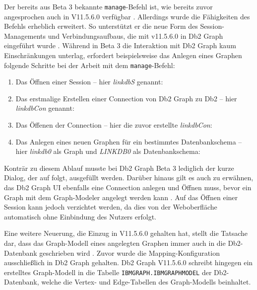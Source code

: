 Der bereits aus Beta 3 bekannte \texttt{manage}-Befehl ist, wie bereits zuvor angesprochen auch in V11.5.6.0 verfügbar \cite{ibm_docs_db2_graph_commands}. Allerdings wurde die Fähigkeiten des Befehls erheblich erweitert. So unterstützt er die neue Form des Session-Managements und Verbindungsaufbaus, die mit v11.5.6.0 in Db2 Graph eingeführt wurde \cite{ibm_docs_db2_graph_commands}. Während in Beta 3 die Interaktion mit Db2 Graph kaum Einschränkungen unterlag, erfordert beispielsweise das Anlegen eines Graphen folgende Schritte bei der Arbeit mit dem \texttt{manage}-Befehl:

\begin{enumerate}
    \item Das Öffnen einer Session -- hier \textit{linkdbS} genannt:\\
    \item Das erstmalige Erstellen einer Connection von Db2 Graph zu Db2 -- hier \textit{linkdbCon} genannt:\\
    \item Das Öffenen der Connection -- hier die zuvor erstellte \textit{linkdbCon}:\\
    \item Das Anlegen eines neuen Graphen für ein bestimmtes Datenbankschema -- hier \textit{linkdb0} als Graph und \textit{LINKDB0} als Datenbankschema:\\ 
\end{enumerate}

Konträr zu diesem Ablauf musste bei Db2 Graph Beta 3 lediglich der kurze Dialog, der auf  folgt, ausgefüllt werden. Darüber hinaus gilt es auch zu erwähnen, das Db2 Graph UI ebenfalls eine Connection anlegen und Öffnen muss, bevor ein Graph mit dem Graph-Modeler angelegt werden kann \cite{ibm_docs_db2_graph_ui}. Auf das Öffnen einer Session kann jedoch verzichtet werden, da dies von der Weboberfläche automatisch ohne Einbindung des Nutzers erfolgt.

Eine weitere Neuerung, die Einzug in V11.5.6.0 gehalten hat, stellt die Tatsache dar, dass das Graph-Modell eines angelegten Graphen immer auch in die Db2-Datenbank geschrieben wird \cite{ibm_docs_privileges}. Zuvor wurde die Mapping-Konfiguration ausschließlich in Db2 Graph gehalten. Db2 Graph V11.5.6.0 schreibt hingegen ein erstelltes Graph-Modell in die Tabelle \texttt{IBMGRAPH.IBMGRAPHMODEL} der Db2-Datenbank, welche die Vertex- und Edge-Tabellen des Graph-Modells beinhaltet. 

